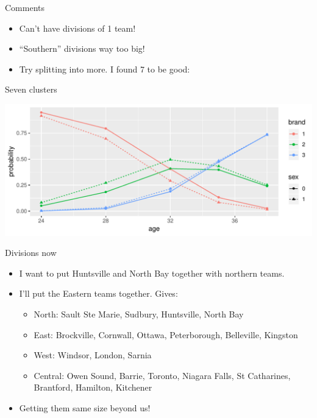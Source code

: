 \begin{frame}[fragile]{Comments}
  
  \begin{itemize}
  \item Can't have divisions of 1 team!
  \item ``Southern'' divisions way too big!
  \item Try splitting into more. I found 7 to be good:
  \end{itemize}

  
\end{frame}

\begin{frame}[fragile]{Seven clusters}
  
\begin{knitrout}
\color{fgcolor}\begin{kframe}
\begin{alltt}
\hlstd{)}
\end{alltt}
\end{kframe}
\includegraphics[width=\maxwidth]{figure/unnamed-chunk-59-1} 

\end{knitrout}
  
\end{frame}

\begin{frame}[fragile]{Divisions now}
  
  \begin{itemize}
  \item I want to put Huntsville and North Bay together with northern teams.
  \item I'll put the Eastern teams together. Gives:
    \begin{itemize}
    \item North: Sault Ste Marie, Sudbury, Huntsville, North Bay
    \item East: Brockville, Cornwall, Ottawa, Peterborough,
      Belleville, Kingston
    \item West:  Windsor, London, Sarnia
    \item Central: Owen Sound, Barrie, Toronto, Niagara Falls, St
      Catharines, Brantford, Hamilton, Kitchener
    \end{itemize}
  \item Getting them same size beyond us!
  \end{itemize}
  
\end{frame}

